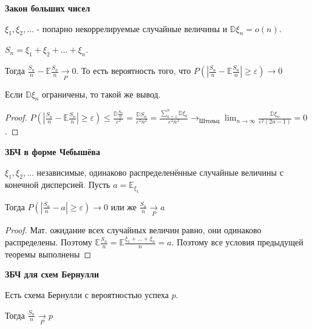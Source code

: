 \begin{theorem}
    \textbf{Закон больших чисел}

    $\xi_1, \xi_2, \ldots$ - попарно некоррелируемые случайные величины и
    $\mathbb{D}\xi_n = o(n)$.

    $S_n = \xi_1 + \xi_2 + \ldots + \xi_n$.

    Тогда $\frac{S_n}{n} - \mathbb{E}\frac{S_n}{n} \underset{P}{\rightarrow} 0$.
    То есть вероятность того, что $P(|\frac{S_n}{n} - \mathbb{E}\frac{S_n}{n}| \geqslant \varepsilon) \rightarrow 0$
\end{theorem}

\begin{consequence}
    Если $\mathbb{D}\xi_n$ ограничены, то такой же вывод.
\end{consequence}

\begin{proof}
    $P(\left |\frac{S_n}{n} - \mathbb{E}\frac{S_n}{n} \right | \geqslant \varepsilon) \leqslant \frac{\mathbb{D}\frac{S_n}{n}}{\varepsilon^2} = \frac{\mathbb{D}S_n}{\varepsilon^2n^2} =
    \frac{\sum_{k = 1}^n \mathbb{D}\xi_k}{\varepsilon^2n^2} \rightarrow_{\text{Штольц}} \lim_{n \to \infty} \frac{\mathbb{D}\xi_n}{\varepsilon^2(2n - 1)} = 0$.
\end{proof}

\begin{consequence}
    \textbf{ЗБЧ в форме Чебышёва}

    $\xi_1, \xi_2, \ldots$ независимые, одинаково распределенённые случайные величины с конечной дисперсией.
    Пусть $a = \mathbb{E}_{\xi_1}$

    Тогда $P(\left | \frac{S_n}{n} - a \right | \geqslant \varepsilon) \rightarrow 0$ или же $\frac{S_n}{n} \underset{P}{\rightarrow} a$

    \begin{proof}
        Мат. ожидание всех случайных величин равно, они одинаково распределены. Поэтому
        $\mathbb{E} \frac{S_n}{n} = \mathbb{E} \frac{\xi_1 + \ldots + \xi_n}{n} = a$. Поэтому все условия предыдущей
        теоремы выполнены
    \end{proof}
\end{consequence}

\begin{consequence}
    \textbf{ЗБЧ для схем Бернулли}

    Есть схема Бернулли с вероятностью успеха $p$.

    Тогда $\frac{S_n}{n} \underset{P}{\rightarrow} p$
\end{consequence}

